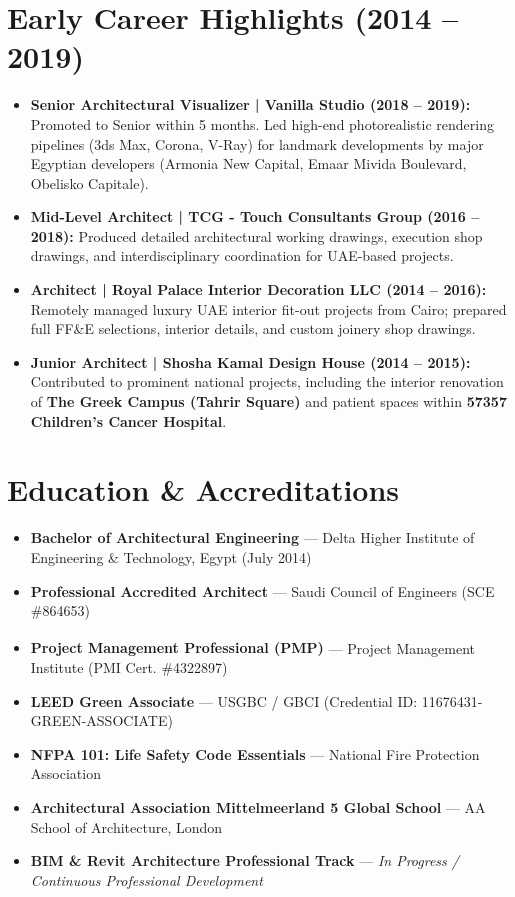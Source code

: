 \documentclass[a4paper,10pt]{article}
\begin{document}
\section{Early Career Highlights (2014 -- 2019)}
\small
\begin{itemize}[leftmargin=10pt, label={$\bullet$}]
    \item \textbf{Senior Architectural Visualizer | Vanilla Studio (2018 -- 2019):} Promoted to Senior within 5 months. Led high-end photorealistic rendering pipelines (3ds Max, Corona, V-Ray) for landmark developments by major Egyptian developers (Armonia New Capital, Emaar Mivida Boulevard, Obelisko Capitale).
    \item \textbf{Mid-Level Architect | TCG - Touch Consultants Group (2016 -- 2018):} Produced detailed architectural working drawings, execution shop drawings, and interdisciplinary coordination for UAE-based projects.
    \item \textbf{Architect | Royal Palace Interior Decoration LLC (2014 -- 2016):} Remotely managed luxury UAE interior fit-out projects from Cairo; prepared full FF\&E selections, interior details, and custom joinery shop drawings.
    \item \textbf{Junior Architect | Shosha Kamal Design House (2014 -- 2015):} Contributed to prominent national projects, including the interior renovation of \textbf{The Greek Campus (Tahrir Square)} and patient spaces within \textbf{57357 Children's Cancer Hospital}.
\end{itemize}

\section{Education \& Accreditations}
\small
\begin{itemize}[leftmargin=10pt, label={$\bullet$}]
    \item \textbf{Bachelor of Architectural Engineering} --- Delta Higher Institute of Engineering \& Technology, Egypt (July 2014)
    \item \textbf{Professional Accredited Architect} --- Saudi Council of Engineers (SCE \#864653)
    \item \textbf{Project Management Professional (PMP\textsuperscript{\textregistered})} --- Project Management Institute (PMI Cert. \#4322897)
    \item \textbf{LEED Green Associate\texttrademark} --- USGBC / GBCI (Credential ID: 11676431-GREEN-ASSOCIATE)
    \item \textbf{NFPA 101: Life Safety Code Essentials} --- National Fire Protection Association
    \item \textbf{Architectural Association Mittelmeerland 5 Global School} --- AA School of Architecture, London
    \item \textbf{BIM \& Revit Architecture Professional Track} --- \textit{In Progress / Continuous Professional Development}
\end{itemize}
\end{document}
